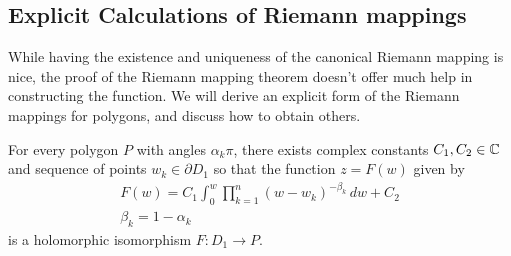 \documentclass{memoir}
\begin{document}
\subsection{Explicit Calculations of Riemann mappings}
\label{sub:explicit_calculations_of_riemann_mappings}

While having the existence and uniqueness of the canonical Riemann mapping is nice, the proof of the Riemann mapping theorem doesn't offer much help in constructing the function. We will derive an explicit form of the Riemann mappings for polygons, and discuss how to obtain others.

%	
%

\begin{thm}
	For every polygon \(P\) with angles \(\alpha_k\pi \), there exists complex constants \(C_1,C_2 \in \mathbb{C}\) and sequence of points \(w_k \in \partial D_1\) so that the function \(z = F(w)\) given by
	\begin{align*}
		F(w) = C_1 \int_{0}^{w} \prod_{k=1}^{n} (w-w_k)^{-\beta_k} \,d w + C_2\\
		\beta_k = 1-\alpha_k
	\end{align*}
	is a holomorphic isomorphism \(F:D_1\to P\).
\end{thm}


\end{document}
